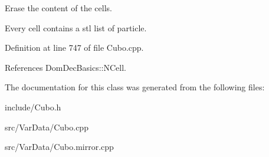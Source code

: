 Erase the content of the cells. 

Every cell contains a stl list of particle. 

Definition at line 747 of file Cubo.\+cpp.



References Dom\+Dec\+Basics\+::\+N\+Cell.



The documentation for this class was generated from the following files\+:\begin{DoxyCompactItemize}
\item 
include/Cubo.\+h\item 
src/\+Var\+Data/Cubo.\+cpp\item 
src/\+Var\+Data/Cubo.\+mirror.\+cpp\end{DoxyCompactItemize}
